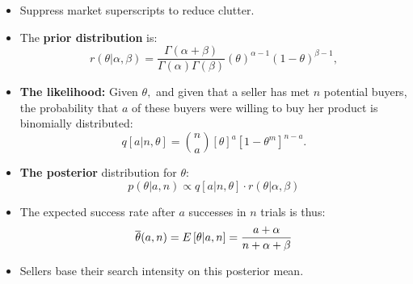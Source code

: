 \documentclass[notes=show]{beamer}
\begin{document}
\begin{frame}%

\label{Bayesian_details}



\begin{itemize}
\item Suppress market superscripts to reduce clutter.

\item The \textbf{prior distribution} is:%
\[
r(\theta |\alpha ,\beta )=\frac{\Gamma (\alpha +\beta )}{\Gamma (\alpha
)\Gamma (\beta )}\left( \theta \right) ^{\alpha -1}(1-\theta )^{\beta -1}, 
\]

\item \textbf{The likelihood:} Given $\theta ,$ and given that a seller has
met $n$ potential buyers, the probability that $a$ of these buyers were
willing to buy her product is binomially distributed: 
\[
q\left[ a|n,\theta \right] =\binom{n}{a}\left[ \theta \right] ^{a}\left[
1-\theta ^{m}\right] ^{n-a}. 
\]
\end{itemize}

\end{frame}%
\begin{frame}%



\begin{itemize}
\item \textbf{The posterior} distribution for $\theta $:%
\[
p(\theta |a,n)\propto q\left[ a|n,\theta \right] \cdot r(\theta |\alpha
,\beta ) 
\]

\item The expected success rate after $a$ successes in $n$ trials is thus: 
\[
\overline{\theta }(a,n)=E\left[ \theta |a,n\right] =\frac{a+\alpha }{%
n+\alpha +\beta } 
\]

\item Sellers base their search intensity on this posterior mean$.$
\end{itemize}

\end{frame}%
\end{document}
